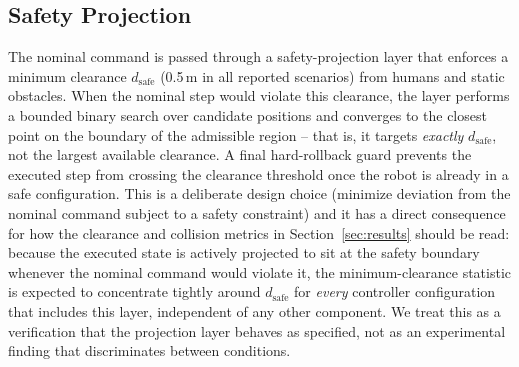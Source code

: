 \documentclass[conference,letterpaper,10pt]{ieeeconf}
\begin{document}
\subsection{Safety Projection}
The nominal command is passed through a safety-projection layer that
enforces a minimum clearance \(d_{\text{safe}}\) (0.5\,m in all reported
scenarios) from humans and static obstacles. When the nominal step would
violate this clearance, the layer performs a bounded binary search over
candidate positions and converges to the closest point on the boundary of
the admissible region -- that is, it targets \emph{exactly}
\(d_{\text{safe}}\), not the largest available clearance. A final
hard-rollback guard prevents the executed step from crossing the
clearance threshold once the robot is already in a safe configuration.
This is a deliberate design choice (minimize deviation from the nominal
command subject to a safety constraint) and it has a direct consequence
for how the clearance and collision metrics in Section~\ref{sec:results}
should be read: because the executed state is actively projected to sit at
the safety boundary whenever the nominal command would violate it, the
minimum-clearance statistic is expected to concentrate tightly around
\(d_{\text{safe}}\) for \emph{every} controller configuration that includes
this layer, independent of any other component. We treat this as a
verification that the projection layer behaves as specified, not as an
experimental finding that discriminates between conditions.
\end{document}
